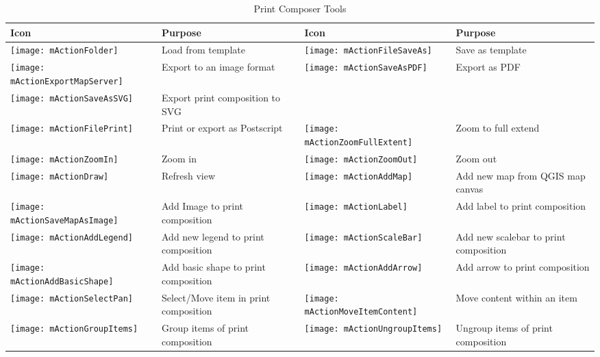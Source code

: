 \begin{table}[h]
\centering
\caption{Print Composer Tools}\label{tab:printcomposer_tools}\medskip
 \begin{tabular}{|l|p{6.9cm}|l|p{6.9cm}|}
 \hline \textbf{Icon} & \textbf{Purpose} & \textbf{Icon} &
 \textbf{Purpose} \\
 \hline \texttt{[image: mActionFolder]}
 & Load from template &
 \texttt{[image: mActionFileSaveAs]} & Save as template \\
 \hline \texttt{[image: mActionExportMapServer]}
 & Export to an image format &
 \texttt{[image: mActionSaveAsPDF]} & Export as PDF \\
 \hline \texttt{[image: mActionSaveAsSVG]} & Export print
 composition to SVG & & \\
 \hline \texttt{[image: mActionFilePrint]} & Print or 
 export as Postscript &
 \texttt{[image: mActionZoomFullExtent]} & Zoom to
 full extend \\
 \hline \texttt{[image: mActionZoomIn]} & Zoom in &
 \texttt{[image: mActionZoomOut]} & Zoom out \\
 \hline \texttt{[image: mActionDraw]} & Refresh 
 view &
 \texttt{[image: mActionAddMap]} & Add 
 new map from QGIS map canvas \\
 \hline \texttt{[image: mActionSaveMapAsImage]} & Add Image to 
 print composition &
 \texttt{[image: mActionLabel]} & Add label to print composition \\
 \hline \texttt{[image: mActionAddLegend]} & Add new legend to 
 print composition & 
 \texttt{[image: mActionScaleBar]} & Add new scalebar to print
 composition\\
 \hline \texttt{[image: mActionAddBasicShape]} & Add basic shape to
 print composition &
 \texttt{[image: mActionAddArrow]} & Add arrow to print
 composition\\
 \hline \texttt{[image: mActionSelectPan]} & Select/Move item in 
 print composition &
 \texttt{[image: mActionMoveItemContent]} & Move content within
 an item \\
 \hline \texttt{[image: mActionGroupItems]} & Group items of 
 print composition & 
 \texttt{[image: mActionUngroupItems]} & Ungroup items of print 
 composition \\

\end{tabular}
\end{table}
